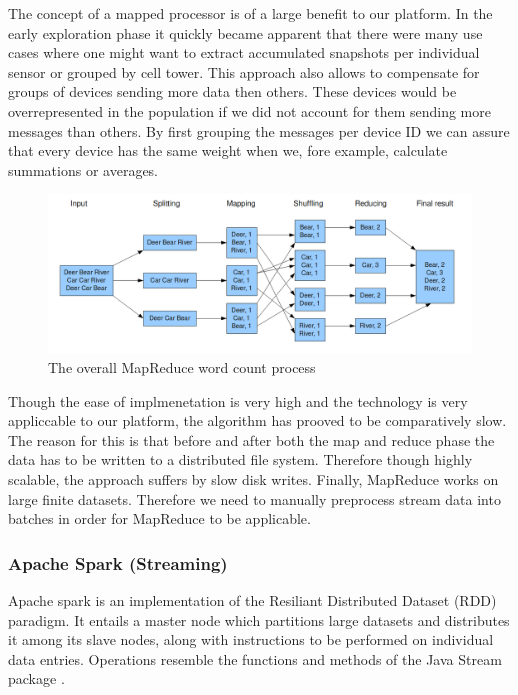 The concept of a mapped processor is of a large benefit to our platform. In the early exploration phase it quickly became apparent that there were many use cases where one might want to extract accumulated snapshots per individual sensor or grouped by cell tower. This approach also allows to compensate for groups of devices sending more data then others. These devices would be overrepresented in the population if we did not account for them sending more messages than others. By first grouping the messages per device ID we can assure that every device has the same weight when we, fore example, calculate summations or averages.

\begin{figure}
\centering
\includegraphics[width=\textwidth]{resources/img/mapreduce.png}
\caption{The overall MapReduce word count process\cite{mapreduce_img}}
\label{img:mapreduce}
\end{figure}

Though the ease of implmenetation is very high and the technology is very appliccable to our platform, the algorithm has prooved to be comparatively slow. The reason for this is that before and after both the map and reduce phase the data has to be written to a distributed file system. Therefore though highly scalable, the approach suffers by slow disk writes\cite{mapreduce_vs_spark}. Finally, MapReduce works on large finite datasets. Therefore we need to manually preprocess stream data into batches in order for MapReduce to be applicable\cite{stream mapreduce}.

\subsubsection{Apache Spark (Streaming)}
Apache spark is an implementation of the Resiliant Distributed Dataset (RDD) paradigm. It entails a master node which partitions large datasets and distributes it among its slave nodes, along with instructions to be performed on individual data entries. Operations resemble the functions and methods of the Java Stream package \cite{java_stream_handleiding}. 

